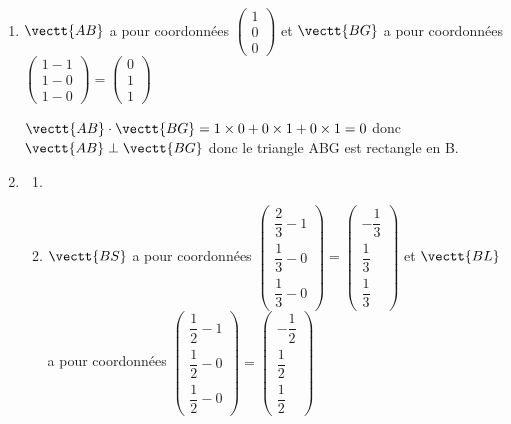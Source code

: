 \begin{enumerate}
\begin{enumerate}
Donc le point L est équidistant des points A, B et G.
		\end{enumerate}

		\item %
$\vectt{AB}$ a pour coordonnées  
$\begin{pmatrix}
1\\ 0 \\ 0
\end{pmatrix}$
et $\vectt{BG}$ a pour coordonnées
$\begin{pmatrix}
1 - 1 \\ 1-0 \\1-0
\end{pmatrix}
=
\begin{pmatrix}
0 \\ 1 \\1
\end{pmatrix}$

$\vectt{AB}\cdot \vectt{BG} = 1\times 0 + 0\times 1 + 0\times 1 = 0$
donc $\vectt{AB}\perp \vectt{BG}$ donc le triangle ABG est rectangle en B.

	\item
		\begin{enumerate}
			\item%
			\item %
$\vectt{BS}$ a pour coordonnées  
$\begin{pmatrix}
\dfrac{2}{3} - 1 \\[5pt] 
\dfrac{1}{3} - 0 \\[5pt] 
\dfrac{1}{3} - 0
\end{pmatrix}
=
\begin{pmatrix}
-\dfrac{1}{3} \\[5pt] 
\dfrac{1}{3}  \\[5pt] 
\dfrac{1}{3} 
\end{pmatrix}$
et  $\vectt{BL}$ a pour coordonnées
$\begin{pmatrix}
\dfrac{1}{2} - 1 \\[5pt] 
\dfrac{1}{2} - 0 \\[5pt] 
\dfrac{1}{2} - 0
\end{pmatrix}
=
\begin{pmatrix}
-\dfrac{1}{2} \\[5pt]
\dfrac{1}{2} \\[5pt]
\dfrac{1}{2} 
\end{pmatrix}$


\end{enumerate}
\end{enumerate}
